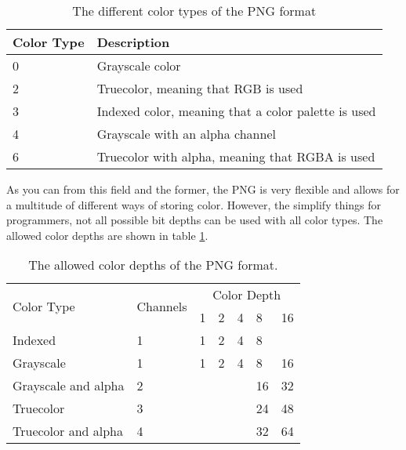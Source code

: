 \begin{table}
  \centering
  \begin{tabular}{l l}
    \toprule
    Color Type & Description \\
    \midrule
    0 & Grayscale color \\
    2 & Truecolor, meaning that RGB is used \\
    3 & Indexed color, meaning that a color palette is used \\
    4 & Grayscale with an alpha channel \\
    6 & Truecolor with alpha, meaning that RGBA is used \\
    \bottomrule
  \end{tabular}
  \caption{The different color types of the PNG format}
  \label{tab:png-color-type}
\end{table}

As you can from this field and the former, the PNG is very flexible
and allows for a multitude of different ways of storing
color. However, the simplify things for programmers, not all possible
bit depths can be used with all color types. The allowed color depths
are shown in table \ref{tab:png-color-type}.

\begin{table}
  \centering

  \newcommand{\invalid}{\cellcolor{gray}}

  \begin{tabular}{|l|l|l|l|l|l|l|}
    \hline
    \multirow{2}{*}{Color Type} & \multirow{2}{*}{Channels} & \multicolumn{5}{c|}{Color Depth} \\

    \cline{3-7}

    & & 1 & 2 & 4 & 8 & 16 \\

    \hline
    Indexed & 1 & 1 & 2 & 4 & 8 & \invalid \\ \hline
    Grayscale & 1 & 1 & 2 & 4 & 8 & 16  \\ \hline
    Grayscale and alpha & 2 & \invalid& \invalid & \invalid & 16 & 32  \\ \hline
    Truecolor & 3 & \invalid & \invalid & \invalid & 24 & 48  \\ \hline
    Truecolor and alpha & 4 & \invalid & \invalid & \invalid & 32 & 64  \\ \hline

    \hline

  \end{tabular}
  \caption{The allowed color depths of the PNG format.}
  \label{tab:png-color-depths}
\end{table}

